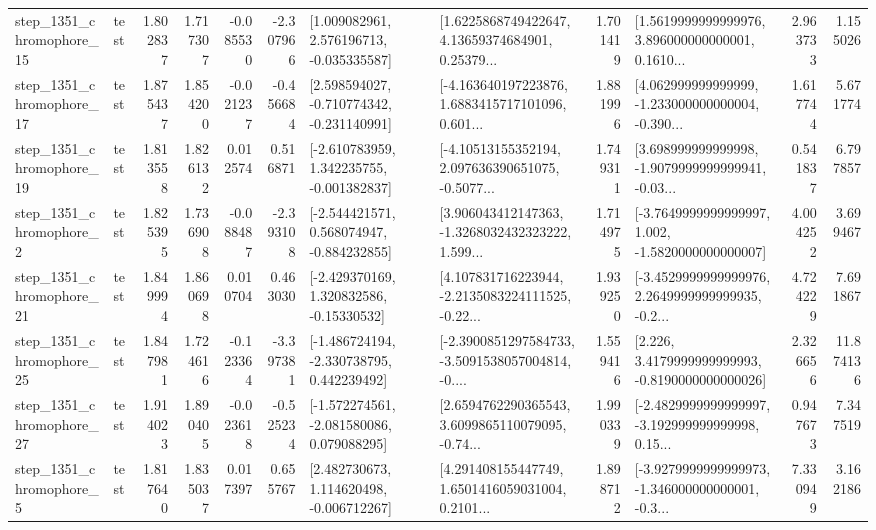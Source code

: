 \begin{tabular}{llrrrrllrlrr}
 step\_1351\_chromophore\_15 &      test &      1.802837 &    1.717307 &     -0.085530 & -2.307966 &    [1.009082961, 2.576196713, -0.035335587] &  [1.6225868749422647, 4.13659374684901, 0.25379... &       1.701419 &  [1.5619999999999976, 3.896000000000001, 0.1610... &            2.963733 &          1.155026 \\
 step\_1351\_chromophore\_17 &      test &      1.875437 &    1.854200 &     -0.021237 & -0.456684 &   [2.598594027, -0.710774342, -0.231140991] &  [-4.163640197223876, 1.6883415717101096, 0.601... &       1.881996 &  [4.062999999999999, -1.233000000000004, -0.390... &            1.617744 &          5.671774 \\
 step\_1351\_chromophore\_19 &      test &      1.813558 &    1.826132 &      0.012574 &  0.516871 &   [-2.610783959, 1.342235755, -0.001382837] &  [-4.10513155352194, 2.097636390651075, -0.5077... &       1.749311 &  [3.698999999999998, -1.9079999999999941, -0.03... &            0.541837 &          6.797857 \\
  step\_1351\_chromophore\_2 &      test &      1.825395 &    1.736908 &     -0.088487 & -2.393108 &   [-2.544421571, 0.568074947, -0.884232855] &  [3.906043412147363, -1.3268032432323222, 1.599... &       1.714975 &  [-3.7649999999999997, 1.002, -1.5820000000000007] &            4.004252 &          3.699467 \\
 step\_1351\_chromophore\_21 &      test &      1.849994 &    1.860698 &      0.010704 &  0.463030 &    [-2.429370169, 1.320832586, -0.15330532] &  [4.107831716223944, -2.2135083224111525, -0.22... &       1.939250 &  [-3.4529999999999976, 2.2649999999999935, -0.2... &            4.724229 &          7.691867 \\
 step\_1351\_chromophore\_25 &      test &      1.847981 &    1.724616 &     -0.123364 & -3.397381 &   [-1.486724194, -2.330738795, 0.442239492] &  [-2.3900851297584733, -3.5091538057004814, -0.... &       1.559416 &   [2.226, 3.4179999999999993, -0.8190000000000026] &            2.326656 &         11.874136 \\
 step\_1351\_chromophore\_27 &      test &      1.914023 &    1.890405 &     -0.023618 & -0.525234 &   [-1.572274561, -2.081580086, 0.079088295] &  [2.6594762290365543, 3.6099865110079095, -0.74... &       1.990339 &  [-2.4829999999999997, -3.192999999999998, 0.15... &            0.947673 &          7.347519 \\
  step\_1351\_chromophore\_5 &      test &      1.817640 &    1.835037 &      0.017397 &  0.655767 &    [2.482730673, 1.114620498, -0.006712267] &  [4.291408155447749, 1.6501416059031004, 0.2101... &       1.898712 &  [-3.9279999999999973, -1.346000000000001, -0.3... &            7.330949 &          3.162186 \\

\end{tabular}
